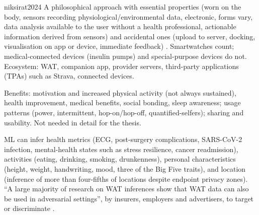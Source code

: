 \begin{papercard}{niksirat2024}
 A philosophical approach with essential properties (worn on the body, sensors recording physiological/environmental data, electronic, forms vary, data analysis available to the user without a health professional, actionable information derived from sensors) and accidental ones (upload to server, docking, visualisation on app or device, immediate feedback) . Smartwatches count; medical-connected devices (insulin pumps) and special-purpose devices do not. Ecosystem: WAT, companion app, provider servers, third-party applications (TPAs) such as Strava, connected devices.

 Benefits: motivation and increased physical activity (not always sustained), health improvement, medical benefits, social bonding, sleep awareness; usage patterns (power, intermittent, hop-on/hop-off, quantified-selfers); sharing and usability. Not needed in detail for the thesis.

 ML can infer health metrics (ECG, post-surgery complications, SARS-CoV-2 infection, mental-health states such as stress resilience, cancer readmission), activities (eating, drinking, smoking, drunkenness), personal characteristics (height, weight, handwriting, mood, three of the Big Five traits), and location (inference of more than four-fifths of locations despite endpoint privacy zones). ``A large majority of research on WAT inferences show that WAT data can also be used in adversarial settings'', by insurers, employers and advertisers, to target or discriminate .


\end{papercard}
